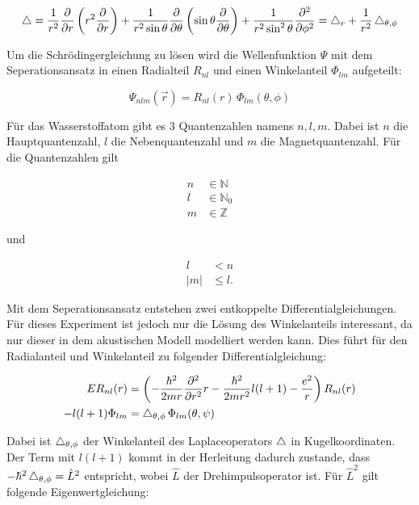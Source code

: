\begin{equation}
    \mathop{}\!\mathbin\bigtriangleup = \frac{1}{r^2} \frac{\partial}{\partial r} \left( r^2 \frac{\partial}{\partial r} \right) + \frac{1}{r^2 \sin \theta} \frac{\partial}{\partial \theta} \left( \sin \theta \frac{\partial}{\partial \theta} \right) + \frac{1}{r^2 \sin^2 \theta} \frac{\partial^2}{\partial \phi^2} = \mathop{}\!\mathbin\bigtriangleup_r + \frac{1}{r^2} \mathop{}\!\mathbin\bigtriangleup_{\theta, \phi}
    \label{eqn:laplace}
\end{equation}

Um die Schrödingergleichung zu lösen wird die Wellenfunktion $\Psi$ mit dem Seperationsansatz in einen Radialteil $R_{nl}$ und einen Winkelanteil $\Phi_{lm}$ aufgeteilt:

\begin{equation}
    \Psi_{nlm} (\vec{r}) = R_{nl}(r) \, \Phi_{lm}(\theta, \phi)
    \label{eqn:seperation}
\end{equation}

Für das Wasserstoffatom gibt es 3 Quantenzahlen namens $n, l, m$. Dabei ist $n$ die Hauptquantenzahl, $l$ die Nebenquantenzahl und $m$ die Magnetquantenzahl. Für die Quantenzahlen gilt

\begin{align*}
    n &\in \mathbb{N} \\
    l &\in \mathbb{N}_0 \\
    m &\in \mathbb{Z}
\end{align*}

und

\begin{align*}
    l &< n \\
    |m| &\leq l .
\end{align*}

Mit dem Seperationsansatz entstehen zwei entkoppelte Differentialgleichungen. Für dieses Experiment ist jedoch nur die Lösung des Winkelanteils interessant, da nur dieser in dem akustischen Modell modelliert werden kann. Dies führt für den Radialanteil und Winkelanteil zu folgender Differentialgleichung:

\begin{align}
    E R_{nl}(r) &= \left( - \frac{\hbar^2}{2mr} \frac{\partial^2}{\partial r^2} r - \frac{\hbar^2}{2mr^2} l(l+1) - \frac{e^2}{r} \right) R_{nl}(r)
    \label{eqn:radial_DGL} \\
    - l (l+1) \Phi_{lm} &= \mathop{}\!\mathbin\bigtriangleup_{\theta, \phi} \, \Phi_{lm} (\theta, \psi) 
    \label{eqn:winkel_DGL}
\end{align}

Dabei ist $\mathop{}\!\mathbin\bigtriangleup_{\theta, \phi}$ der Winkelanteil des Laplaceoperators $\mathop{}\!\mathbin\bigtriangleup$ in Kugelkoordinaten. Der Term mit $l (l+1)$ kommt in der Herleitung dadurch zustande, dass $- \hbar^2 \mathop{}\!\mathbin\bigtriangleup_{\theta, \phi} = \hat{L}^2$ entspricht, wobei $\hat{L}$ der Drehimpulsoperator ist. Für $\hat{L}^2$ gilt folgende Eigenwertgleichung:

